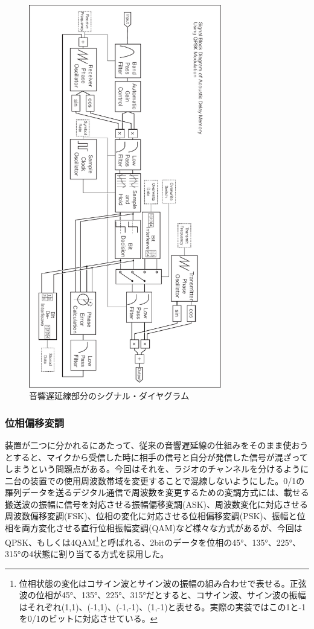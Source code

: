 \documentclass[a4paper,report]{jsbook}
\begin{document}
\begin{figure}[htbp]
\centering
\includegraphics[width=0.75000\textwidth]{./img/adm2_diagram.pdf}
\caption{音響遅延線部分のシグナル・ダイヤグラム\label{fig:adm2diagram}}
\end{figure}

\subsubsection{位相偏移変調}\label{ux4f4dux76f8ux504fux79fbux5909ux8abf}

装置が二つに分かれるにあたって、従来の音響遅延線の仕組みをそのまま使おうとすると、マイクから受信した時に相手の信号と自分が発信した信号が混ざってしまうという問題点がある。今回はそれを、ラジオのチャンネルを分けるように二台の装置での使用周波数帯域を変更することで混線しないようにした。0/1の羅列データを送るデジタル通信で周波数を変更するための変調方式には、載せる搬送波の振幅に信号を対応させる振幅偏移変調(ASK)、周波数変化に対応させる周波数偏移変調(FSK)、位相の変化に対応させる位相偏移変調(PSK)、振幅と位相を両方変化させる直行位相振幅変調(QAM)など様々な方式があるが、今回はQPSK、もしくは4QAM\footnote{位相状態の変化はコサイン波とサイン波の振幅の組み合わせで表せる。正弦波の位相が45°、135°、225°、315°だとすると、コサイン波、サイン波の振幅はそれぞれ(1,1)、(-1,1)、(-1,-1)、(1,-1)と表せる。実際の実装ではこの1と-1を0/1のビットに対応させている。}と呼ばれる、2bitのデータを位相の45°、135°、225°、315°の4状態に割り当てる方式を採用した。
\end{document}
